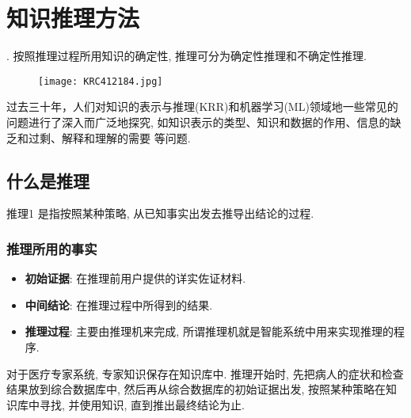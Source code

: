 \chapter{知识推理方法}\label{AIchap3}
\begin{tcolorbox}[colback=white!50,colframe=orange!50,title=智能系统的推理过程]
. 按照推理过程所用知识的确定性, 推理可分为确定性推理和不确定性推理.
\end{tcolorbox}
\begin{figure}[H]
\centering
\texttt{[image: KRC412184.jpg]}
\label{KRC412184004}
\end{figure}

过去三十年，人们对知识的表示与推理(KRR)和机器学习(ML)领域地一些常见的问题进行了深入而广泛地探究, 如知识表示的类型、知识和数据的作用、信息的缺乏和过剩、解释和理解的需要 \cite{BouraouiKR2019}等问题.
\section{什么是推理}
\begin{mydef}{推理}{1}
    是指按照某种策略, 从已知事实出发去推导出结论的过程.
\end{mydef}
\subsection{推理所用的事实}
\begin{itemize}
\item \textbf{初始证据}: 在推理前用户提供的详实佐证材料.
\item \textbf{中间结论}: 在推理过程中所得到的结果.
\item \textbf{推理过程}: 主要由推理机来完成, 所谓推理机就是智能系统中用来实现推理的程序.
\end{itemize}
\begin{example}
  对于医疗专家系统, 专家知识保存在知识库中. 推理开始时, 先把病人的症状和检查结果放到综合数据库中, 然后再从综合数据库的初始证据出发, 按照某种策略在知识库中寻找, 并使用知识, 直到推出最终结论为止.
\end{example}

